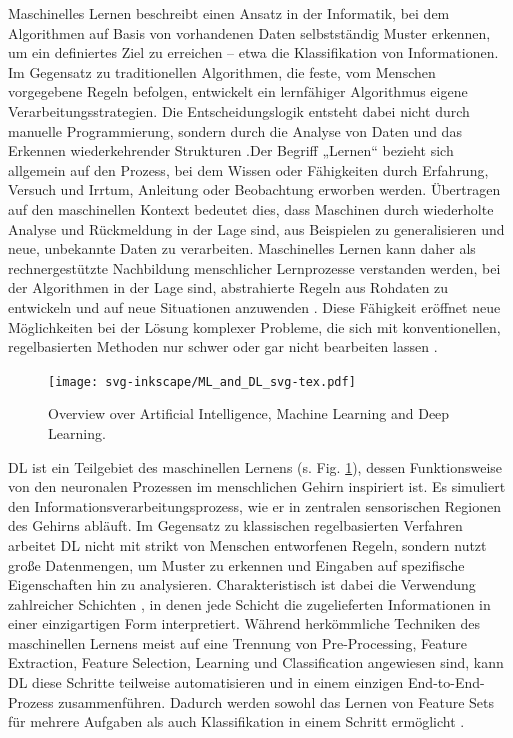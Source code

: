 Maschinelles Lernen beschreibt einen Ansatz in der Informatik, bei dem Algorithmen auf Basis von vorhandenen Daten selbstständig Muster erkennen, um ein definiertes Ziel zu erreichen – etwa die Klassifikation von Informationen. Im Gegensatz zu traditionellen Algorithmen, die feste, vom Menschen vorgegebene Regeln befolgen, entwickelt ein lernfähiger Algorithmus eigene Verarbeitungsstrategien. Die Entscheidungslogik entsteht dabei nicht durch manuelle Programmierung, sondern durch die Analyse von Daten und das Erkennen wiederkehrender Strukturen \cite{Shetty2022}.Der Begriff „Lernen“ bezieht sich allgemein auf den Prozess, bei dem Wissen oder Fähigkeiten durch Erfahrung, Versuch und Irrtum, Anleitung oder Beobachtung erworben werden. Übertragen auf den maschinellen Kontext bedeutet dies, dass Maschinen durch wiederholte Analyse und Rückmeldung in der Lage sind, aus Beispielen zu generalisieren und neue, unbekannte Daten zu verarbeiten. Maschinelles Lernen kann daher als rechnergestützte Nachbildung menschlicher Lernprozesse verstanden werden, bei der Algorithmen in der Lage sind, abstrahierte Regeln aus Rohdaten zu entwickeln und auf neue Situationen anzuwenden \cite{Fischer1999, Braga-Neto2020}. Diese Fähigkeit eröffnet neue Möglichkeiten bei der Lösung komplexer Probleme, die sich mit konventionellen, regelbasierten Methoden nur schwer oder gar nicht bearbeiten lassen \cite{Goodfellow-et-al-2016}.

\begin{figure}[h]
    \centering
    \texttt{[image: svg-inkscape/ML\_and\_DL\_svg-tex.pdf]}
    \caption{Overview over Artificial Intelligence, Machine Learning and Deep Learning. \cite{Alzubaidi2021}}
    \label{fig:ML_andD_L}
\end{figure}

\acrfull{DL} ist ein Teilgebiet des maschinellen Lernens (s. Fig. \ref{fig:ML_andD_L}), dessen Funktionsweise von den neuronalen Prozessen im menschlichen Gehirn inspiriert ist. Es simuliert den Informationsverarbeitungsprozess, wie er in zentralen sensorischen Regionen des Gehirns abläuft. Im Gegensatz zu klassischen regelbasierten Verfahren arbeitet \acrshort{DL} nicht mit strikt von Menschen entworfenen Regeln, sondern nutzt große Datenmengen, um Muster zu erkennen und Eingaben auf spezifische Eigenschaften hin zu analysieren. Charakteristisch ist dabei die Verwendung zahlreicher Schichten , in denen jede Schicht die zugelieferten Informationen in einer einzigartigen Form interpretiert. Während herkömmliche Techniken des maschinellen Lernens meist auf eine Trennung von Pre-Processing, Feature Extraction, Feature Selection, Learning und Classification angewiesen sind, kann \acrshort{DL} diese Schritte teilweise automatisieren und in einem einzigen End-to-End-Prozess zusammenführen. Dadurch werden sowohl das Lernen von Feature Sets für mehrere Aufgaben als auch Klassifikation in einem Schritt ermöglicht \cite{Alzubaidi2021}. 

